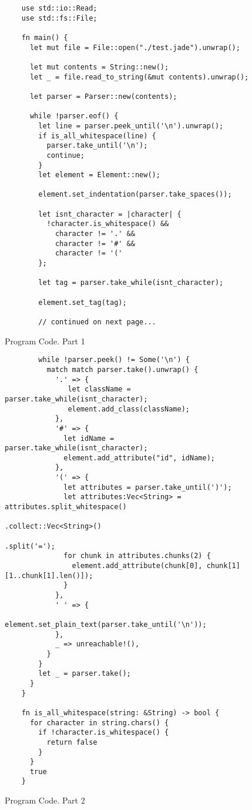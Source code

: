 \begin{figure}[ht!]
  \begin{verbatim}
    use std::io::Read;
    use std::fs::File;

    fn main() {
      let mut file = File::open("./test.jade").unwrap();

      let mut contents = String::new();
      let _ = file.read_to_string(&mut contents).unwrap();

      let parser = Parser::new(contents);

      while !parser.eof() {
        let line = parser.peek_until('\n').unwrap();
        if is_all_whitespace(line) {
          parser.take_until('\n');
          continue;
        }
        let element = Element::new();

        element.set_indentation(parser.take_spaces());

        let isnt_character = |character| {
          !character.is_whitespace() && 
            character != '.' &&
            character != '#' &&
            character != '('
        };

        let tag = parser.take_while(isnt_character);

        element.set_tag(tag);

        // continued on next page...        
  \end{verbatim}
  \caption{Program Code. Part 1}
\end{figure}

\begin{figure}[ht!]
  \begin{verbatim}
        while !parser.peek() != Some('\n') {
          match match parser.take().unwrap() {
            '.' => {
               let className = parser.take_while(isnt_character);
               element.add_class(className);
            },
            '#' => {
              let idName = parser.take_while(isnt_character);
              element.add_attribute("id", idName);
            },
            '(' => {
              let attributes = parser.take_until(')');
              let attributes:Vec<String> = attributes.split_whitespace()
                                                     .collect::Vec<String>()
                                                     .split('=');
              for chunk in attributes.chunks(2) {
                element.add_attribute(chunk[0], chunk[1][1..chunk[1].len()]);
              }
            },
            ' ' => {
              element.set_plain_text(parser.take_until('\n'));
            },
            _ => unreachable!(),
          }
        }
        let _ = parser.take();
      }
    }

    fn is_all_whitespace(string: &String) -> bool {
      for character in string.chars() {
        if !character.is_whitespace() {
          return false
        }
      }
      true
    }
  \end{verbatim}
  \caption{Program Code. Part 2}
\end{figure}